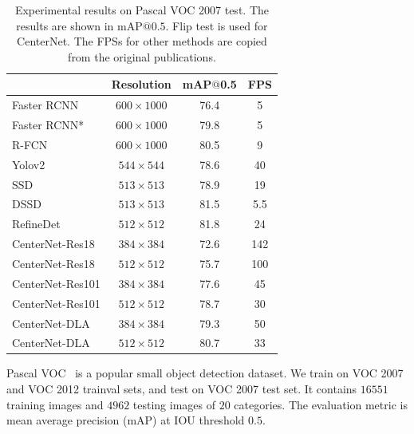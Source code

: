 \documentclass[10pt,twocolumn,letterpaper]{article}
\begin{document}
\begin{table}[t]
\centering
\begin{tabular}{l c c c}
\hline
 & Resolution  & mAP$@$0.5 & FPS \\
 \hline
 Faster RCNN~\cite{ren2015faster} & $600 \times 1000$ & 76.4 & 5 \\
 Faster RCNN*~\cite{chen17implementation} &  $600 \times 1000$ & 79.8 & 5 \\
R-FCN~\cite{dai2016r} &  $600 \times 1000$ & 80.5 & 9 \\
 Yolov2~\cite{redmon2017yolo9000} & $544 \times 544$ & 78.6 & 40 \\
 SSD~\cite{fu2017dssd} & $513 \times 513$ & 78.9 & 19 \\
 DSSD~\cite{fu2017dssd} & $513 \times 513$ & 81.5 & 5.5 \\
 RefineDet~\cite{zhang2018single} & $512 \times 512$ & 81.8 & 24 \\
\hline
CenterNet-Res18 & $384 \times 384$ & 72.6 & 142\\
CenterNet-Res18 & $512 \times 512$ & 75.7 &  100\\
CenterNet-Res101 &$384 \times 384$ & 77.6 & 45\\ 
CenterNet-Res101 & $512 \times 512$  & 78.7 & 30\\
CenterNet-DLA  & $384 \times 384$& 79.3 & 50\\
CenterNet-DLA & $512 \times 512$  & 80.7& 33\\
\hline
\end{tabular}
\caption{Experimental results on Pascal VOC 2007 test. The results are shown in mAP$@0.5$. Flip test is used for CenterNet. The FPSs for other methods are copied from the original publications.}
\label{tab:pascal}
\end{table}

Pascal VOC~\cite{pascal-voc-2012} is a popular small object detection dataset. 
We train on VOC 2007 and VOC 2012 trainval sets, and test on VOC 2007 test set.
It contains $16551$ training images and $4962$ testing images of $20$ categories. 
The evaluation metric is mean average precision (mAP) at IOU threshold $0.5$.
\end{document}
